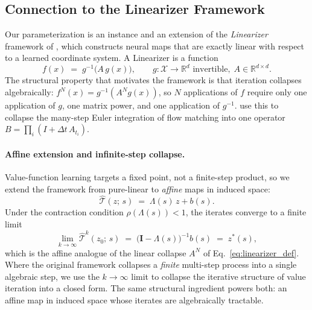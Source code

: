 \documentclass{article}
\newcommand{\R}{\mathbb{R}}
\newcommand{\cT}{\hat{\mathcal{T}}}          %
\newcommand{\zstar}{z^*}                     %
\begin{document}
\subsection{Connection to the Linearizer Framework}
\label{sec:linearizer_connection}

Our parameterization is an instance and an extension of the
\emph{Linearizer} framework of \citet{anonymous2026linearizer}, which constructs
neural maps that are exactly linear with respect to a learned coordinate system.
A Linearizer is a function
\begin{equation}
  f(x) \;=\; g^{-1}\bigl(A\, g(x)\bigr),
  \qquad g\colon \mathcal{X} \to \R^d \text{ invertible},\; A \in \R^{d\times d}.
  \label{eq:linearizer_def}
\end{equation}
The structural property that motivates the framework is that iteration collapses
algebraically: $f^{N}(x) = g^{-1}(A^{N} g(x))$, so $N$ applications of $f$
require only one application of $g$, one matrix power, and one application of
$g^{-1}$. \citet{anonymous2026linearizer} use this to collapse the many-step
Euler integration of flow matching into one operator
$B = \prod_{i}(I + \Delta t\, A_{t_i})$.

\paragraph{Affine extension and infinite-step collapse.}
Value-function learning targets a fixed point, not a finite-step product, so we
extend the framework from pure-linear to \emph{affine} maps in induced space:
\begin{equation}
  \cT(z;\,s) \;=\; \Lambda(s)\, z + b(s).
  \label{eq:affine_T}
\end{equation}
Under the contraction condition $\rho(\Lambda(s)) < 1$, the iterates converge
to a finite limit
\begin{equation}
  \lim_{k\to\infty} \cT^{k}(z_0;\,s)
  \;=\; \bigl(\mathbf{I} - \Lambda(s)\bigr)^{-1} b(s)
  \;=\; \zstar(s),
  \label{eq:affine_collapse}
\end{equation}
which is the affine analogue of the linear collapse $A^N$ of
Eq.~\eqref{eq:linearizer_def}. Where the original framework collapses a
\emph{finite} multi-step process into a single algebraic step, we use the
$k\!\to\!\infty$ limit to collapse the iterative structure of value iteration
into a closed form. The same structural ingredient powers both: an affine map
in induced space whose iterates are algebraically tractable.
\end{document}
